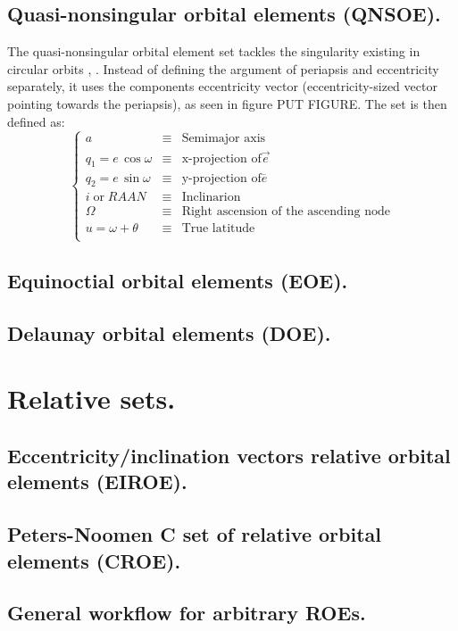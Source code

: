 	\subsection{Quasi-nonsingular orbital elements (QNSOE).}
	\indent The quasi-nonsingular orbital element set tackles the singularity existing in circular orbits \cite{Gim_Alfriend}, \cite{dAmicoDLR}. Instead of defining the argument of periapsis and eccentricity separately, it uses the components eccentricity vector (eccentricity-sized vector pointing towards the periapsis), as seen in figure PUT FIGURE. The set is then defined as: \\
	\begin{equation}
	\left\{ 
	\begin{array}{lll}
	a & \equiv & \text{Semimajor axis}\\
	q_1 = e\, \cos \omega & \equiv & \text{x-projection of} \vec{e}\\
	q_2 = e\, \sin \omega & \equiv & \text{y-projection of} \overline{e}\\
	i \; \text{or} \; RAAN & \equiv & \text{Inclinarion}\\
	\Omega & \equiv & \text{Right ascension of the ascending node}\\
	u = \omega + \theta & \equiv & \text{True latitude}\\
	\end{array}
	\right.
	\end{equation}
	\subsection{Equinoctial orbital elements (EOE).}
	\subsection{Delaunay orbital elements (DOE).}
%
\section{Relative sets.}
%
%
	\subsection{Eccentricity/inclination vectors relative orbital elements (EIROE).}
	\subsection{Peters-Noomen C set of relative orbital elements (CROE).}
	\subsection{General workflow for arbitrary ROEs.}
%